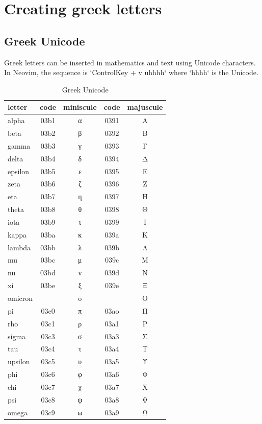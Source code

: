 \section{Creating greek letters}\label{sec:greek_letters}

\subsection{Greek Unicode}\label{sec:greek_unicode}

Greek letters can be inserted in mathematics and text using Unicode characters. In Neovim, the sequence is `ControlKey + v uhhhh` where `hhhh` is the Unicode.
\begin{longtable}[l]{lcccc}
    \caption{Greek Unicode} \label{tab:greek_unicode} \\
    \toprule
    letter  & code & miniscule & code & majuscule \\
    \midrule
    \endhead %
    alpha   & 03b1 & α & 0391 & Α \\
    beta    & 03b2 & β & 0392 & Β \\
    gamma   & 03b3 & γ & 0393 & Γ \\
    delta   & 03b4 & δ & 0394 & Δ \\
    epsilon & 03b5 & ε & 0395 & Ε \\
    zeta    & 03b6 & ζ & 0396 & Ζ \\
    eta     & 03b7 & η & 0397 & Η \\
    theta   & 03b8 & θ & 0398 & Θ \\
    iota    & 03b9 & ι & 0399 & Ι \\
    kappa   & 03ba & κ & 039a & Κ \\
    lambda  & 03bb & λ & 039b & Λ \\
    mu      & 03bc & μ & 039c & Μ \\
    nu      & 03bd & ν & 039d & Ν \\
    xi      & 03be & ξ & 039e & Ξ \\
    omicron &      & o &      & O \\
    pi      & 03c0 & π & 03ao & Π \\
    rho     & 03c1 & ρ & 03a1 & Ρ \\
    sigma   & 03c3 & σ & 03a3 & Σ \\
    tau     & 03c4 & τ & 03a4 & Τ \\
    upsilon & 03c5 & υ & 03a5 & Υ \\
    phi     & 03c6 & φ & 03a6 & Φ \\
    chi     & 03c7 & χ & 03a7 & Χ \\
    psi     & 03c8 & ψ & 03a8 & Ψ \\
    omega   & 03c9 & ω & 03a9 & Ω \\
    \bottomrule
\end{longtable}
